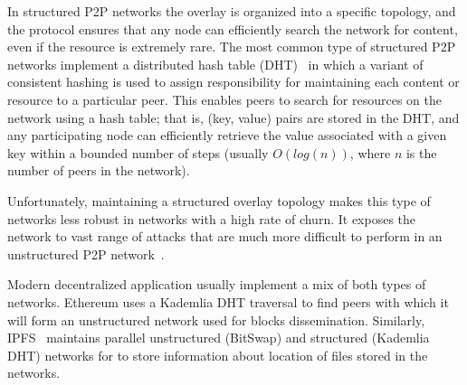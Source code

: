 In structured P2P networks the overlay is organized into a specific topology, and the protocol ensures that any node can efficiently search the network for content, even if the resource is extremely rare. The most common type of structured P2P networks implement a distributed hash table (DHT)~\cite{kademlia, chord, pastry, can, tapestry} in which a variant of consistent hashing is used to assign responsibility for maintaining each content or resource to a particular peer. This enables peers to search for resources on the network using a hash table; that is, (key, value) pairs are stored in the DHT, and any participating node can efficiently retrieve the value associated with a given key within a bounded number of steps (usually $O(log(n))$, where $n$ is the number of peers in the network).

Unfortunately, maintaining a structured overlay topology makes this type of networks less robust in networks with a high rate of churn. It exposes the network to vast range of attacks that are much more difficult to perform in an unstructured P2P network~\cite{Trifa2012TaxonomyOS}.

Modern decentralized application usually implement a mix of both types of networks. Ethereum uses a Kademlia DHT traversal to find peers with which it will form an unstructured network used for blocks dissemination. Similarly, IPFS~\cite{ipfs} maintains parallel unstructured (BitSwap) and structured (Kademlia DHT) networks for to store information about location of files stored in the networks. 

